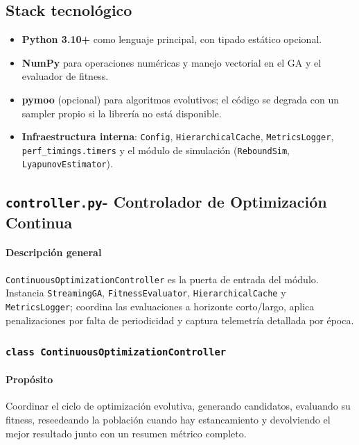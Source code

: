 \subsection{Stack tecnológico}
\begin{itemize}
    \item \textbf{Python 3.10+} como lenguaje principal, con tipado estático opcional.
    \item \textbf{NumPy} para operaciones numéricas y manejo vectorial en el GA y el evaluador de fitness.
    \item \textbf{pymoo} (opcional) para algoritmos evolutivos; el código se degrada con un sampler propio si la librería no está disponible.
    \item \textbf{Infraestructura interna}: \texttt{Config}, \texttt{HierarchicalCache}, \texttt{MetricsLogger}, \texttt{perf\_timings.timers} y el módulo de simulación (\texttt{ReboundSim}, \texttt{LyapunovEstimator}).
\end{itemize}


\subsection{\texttt{controller.py}\-- Controlador de Optimización Continua}
\paragraph{Descripción general}
\texttt{ContinuousOptimizationController} es la puerta de entrada del módulo. Instancia \texttt{StreamingGA}, \texttt{FitnessEvaluator}, \texttt{HierarchicalCache} y \texttt{MetricsLogger}; coordina las evaluaciones a horizonte corto/largo, aplica penalizaciones por falta de periodicidad y captura telemetría detallada por época.

\subsubsection{\texttt{class ContinuousOptimizationController}}
\paragraph{Propósito} Coordinar el ciclo de optimización evolutiva, generando candidatos, evaluando su fitness, reseedeando la población cuando hay estancamiento y devolviendo el mejor resultado junto con un resumen métrico completo.

